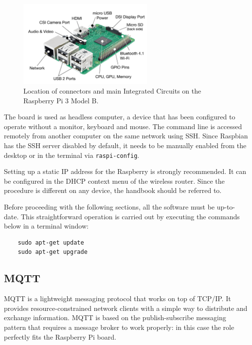 \begin{figure}[H]
	\begin{center}
		\includegraphics[width=0.6\textwidth]{./pictures/rpi_connections.png}
		\caption{Location of connectors and main Integrated Circuits on the Raspberry Pi 3 Model B.}
		\label{rpi_connections}
	\end{center}
\end{figure}

\noindent
The board is used as headless computer, a device that has been configured to operate without a monitor, keyboard and mouse. The command line is accessed remotely from another computer on the same network using SSH. Since Raspbian has the SSH server disabled by default, it needs to be manually enabled from the desktop or in the terminal via \texttt{raspi-config}.

Setting up a static IP address for the Raspberry is strongly recommended. It can be configured in the DHCP context menu of the wireless router. Since the procedure is different on any device, the handbook should be referred to.

Before proceeding with the following sections, all the software must be up-to-date. This straightforward operation is carried out by executing the commands below in a terminal window:

\begin{verbatim}
    sudo apt-get update
    sudo apt-get upgrade
\end{verbatim}

\subsection{MQTT}
MQTT is a lightweight messaging protocol that works on top of TCP/IP. It provides resource-constrained network clients with a simple way to distribute and exchange information. MQTT is based on the publish-subscribe messaging pattern that requires a message broker to work properly: in this case the role perfectly fits the Raspberry Pi board.

